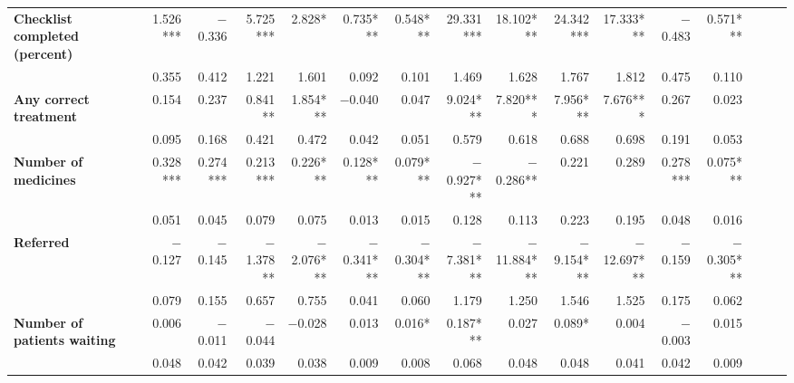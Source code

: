 \begin{tabular}{@{\extracolsep{5pt}}lrrrrrrrrrrrrrrr}
{\bf Checklist completed (percent)} & 1.526*** & $-$0.336\phantom{***} & 5.725*** & 2.828*\phantom{**} & 0.735*** & 0.548*** & 29.331*** & 18.102*** & 24.342*** & 17.333*** & $-$0.483\phantom{***} & 0.571*** \\
{\bf } & 0.355\phantom{***} & 0.412\phantom{***} & 1.221\phantom{***} & 1.601\phantom{***} & 0.092\phantom{***} & 0.101\phantom{***} & 1.469\phantom{***} & 1.628\phantom{***} & 1.767\phantom{***} & 1.812\phantom{***} & 0.475\phantom{***} & 0.110\phantom{***} \\
{\bf Any correct treatment} & 0.154\phantom{***} & 0.237\phantom{***} & 0.841**\phantom{*} & 1.854*** & $-$0.040\phantom{***} & 0.047\phantom{***} & 9.024*** & 7.820*** & 7.956*** & 7.676*** & 0.267\phantom{***} & 0.023\phantom{***} \\
{\bf } & 0.095\phantom{***} & 0.168\phantom{***} & 0.421\phantom{***} & 0.472\phantom{***} & 0.042\phantom{***} & 0.051\phantom{***} & 0.579\phantom{***} & 0.618\phantom{***} & 0.688\phantom{***} & 0.698\phantom{***} & 0.191\phantom{***} & 0.053\phantom{***} \\
{\bf Number of medicines} & 0.328*** & 0.274*** & 0.213*** & 0.226*** & 0.128*** & 0.079*** & $-$0.927*** & $-$0.286**\phantom{*} & 0.221\phantom{***} & 0.289\phantom{***} & 0.278*** & 0.075*** \\
{\bf } & 0.051\phantom{***} & 0.045\phantom{***} & 0.079\phantom{***} & 0.075\phantom{***} & 0.013\phantom{***} & 0.015\phantom{***} & 0.128\phantom{***} & 0.113\phantom{***} & 0.223\phantom{***} & 0.195\phantom{***} & 0.048\phantom{***} & 0.016\phantom{***} \\
{\bf Referred} & $-$0.127\phantom{***} & $-$0.145\phantom{***} & $-$1.378**\phantom{*} & $-$2.076*** & $-$0.341*** & $-$0.304*** & $-$7.381*** & $-$11.884*** & $-$9.154*** & $-$12.697*** & $-$0.159\phantom{***} & $-$0.305*** \\
{\bf } & 0.079\phantom{***} & 0.155\phantom{***} & 0.657\phantom{***} & 0.755\phantom{***} & 0.041\phantom{***} & 0.060\phantom{***} & 1.179\phantom{***} & 1.250\phantom{***} & 1.546\phantom{***} & 1.525\phantom{***} & 0.175\phantom{***} & 0.062\phantom{***} \\
{\bf Number of patients waiting} & 0.006\phantom{***} & $-$0.011\phantom{***} & $-$0.044\phantom{***} & $-$0.028\phantom{***} & 0.013\phantom{***} & 0.016*\phantom{**} & 0.187*** & 0.027\phantom{***} & 0.089*\phantom{**} & 0.004\phantom{***} & $-$0.003\phantom{***} & 0.015\phantom{***} \\
{\bf } & 0.048\phantom{***} & 0.042\phantom{***} & 0.039\phantom{***} & 0.038\phantom{***} & 0.009\phantom{***} & 0.008\phantom{***} & 0.068\phantom{***} & 0.048\phantom{***} & 0.048\phantom{***} & 0.041\phantom{***} & 0.042\phantom{***} & 0.009\phantom{***} \\

\end{tabular}
